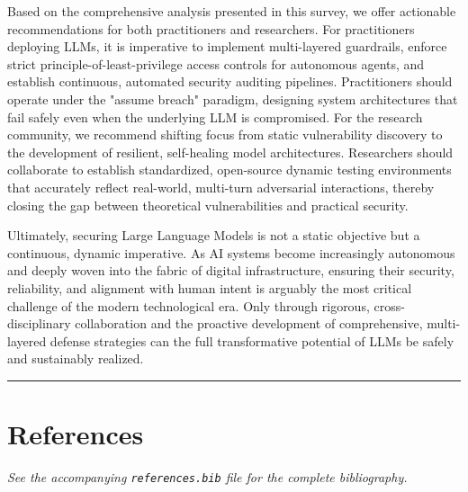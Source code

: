 \documentclass[11pt,a4paper]{article}
\begin{document}
Based on the comprehensive analysis presented in this survey, we offer actionable recommendations for both practitioners and researchers. For practitioners deploying LLMs, it is imperative to implement multi-layered guardrails, enforce strict principle-of-least-privilege access controls for autonomous agents, and establish continuous, automated security auditing pipelines. Practitioners should operate under the "assume breach" paradigm, designing system architectures that fail safely even when the underlying LLM is compromised. For the research community, we recommend shifting focus from static vulnerability discovery to the development of resilient, self-healing model architectures. Researchers should collaborate to establish standardized, open-source dynamic testing environments that accurately reflect real-world, multi-turn adversarial interactions, thereby closing the gap between theoretical vulnerabilities and practical security.

Ultimately, securing Large Language Models is not a static objective but a continuous, dynamic imperative. As AI systems become increasingly autonomous and deeply woven into the fabric of digital infrastructure, ensuring their security, reliability, and alignment with human intent is arguably the most critical challenge of the modern technological era. Only through rigorous, cross-disciplinary collaboration and the proactive development of comprehensive, multi-layered defense strategies can the full transformative potential of LLMs be safely and sustainably realized.

\noindent\rule{\textwidth}{0.4pt}
\section{References}

\textit{See the accompanying \texttt{references.bib} file for the complete bibliography.}




\end{document}
